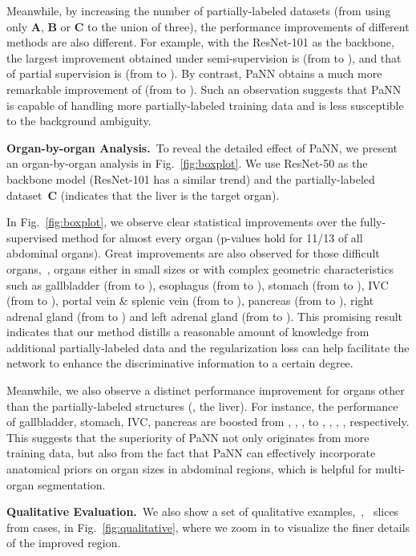 \documentclass[10pt,twocolumn,letterpaper]{article}
\begin{document}
Meanwhile, by increasing the number of partially-labeled datasets (from using only \textbf{A}, \textbf{B} or \textbf{C} to the union of three), the performance improvements of different methods are also different. For example, with the ResNet-101 as the backbone, the largest improvement obtained under semi-supervision is  (from  to ), and that of partial supervision is  (from  to ). By contrast, PaNN obtains a much more remarkable improvement of  (from  to ). Such an observation suggests that PaNN is capable of handling more partially-labeled training data and is less susceptible to the background ambiguity.

\vspace{1ex}\noindent\textbf{Organ-by-organ Analysis.}~To reveal the detailed effect of PaNN, we present an organ-by-organ analysis in Fig.~\ref{fig:boxplot}. We use ResNet-50 as the backbone model (ResNet-101 has a similar trend) and the partially-labeled dataset~\textbf{C} (indicates that the liver is the target organ).

In Fig.~\ref{fig:boxplot}, we observe clear statistical improvements over the fully-supervised method for almost every organ (p-values  hold for 11/13 of all abdominal organs). Great improvements are also observed for those difficult organs,~\ie, organs either in small sizes or with complex geometric characteristics such as gallbladder (from  to ), esophagus (from  to ), stomach (from  to ), IVC (from  to ), portal vein \& splenic vein (from  to ), pancreas (from  to ), right adrenal gland (from  to ) and left adrenal gland (from  to ). This promising result indicates that our method distills a reasonable amount of knowledge from additional partially-labeled data and the regularization loss can help facilitate the network to enhance the discriminative information to a certain degree.

Meanwhile, we also observe a distinct performance improvement for organs other than the partially-labeled structures (\ie, the liver). For instance, the performance of gallbladder, stomach, IVC, pancreas are boosted from , , ,  to , , , , respectively. This suggests that the superiority of PaNN not only originates from more training data, but also from the fact that PaNN can effectively incorporate anatomical priors on organ sizes in abdominal regions, which is helpful for multi-organ segmentation.

\vspace{1ex}\noindent\textbf{Qualitative Evaluation.}~We also show a set of qualitative examples,~\ie,~ slices from  cases, in Fig.~\ref{fig:qualitative}, where we zoom in to visualize the finer details of the improved region. 
\end{document}

